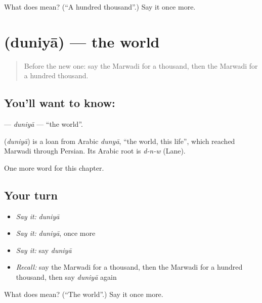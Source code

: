 \begin{tcolorbox}[breakable,colback=teal!4,colframe=teal!35!black,title={Before you move on}]
What does  mean? (\textquotedblleft{}A hundred thousand\textquotedblright{}.) Say it once more.
\end{tcolorbox}
\section[\texorpdfstring{\mw{दुनिया} (duniyā)}{दुनिया (duniyā)}]{ (duniyā) — the world}

\label{lesson:MW-C87-duniya}



\begin{quote}
Before the new one: say the Marwadi for a thousand, then the Marwadi for a hundred thousand.
\end{quote}

\subsection*{You'll want to know: }
\textbf{} — \emph{duniyā} — \textquotedblleft{}the world\textquotedblright{}.

\begin{cousinweb}
\textbf{} (\emph{duniyā}) is a loan from Arabic \emph{dunyā}, \textquotedblleft{}the world, this life\textquotedblright{}, which reached Marwadi through Persian. Its Arabic root is \emph{d-n-w} (Lane).
\end{cousinweb}

\begin{grammarlens}[title={What you've built}]
One more word for this chapter.
\end{grammarlens}

\subsection*{Your turn}
\begin{itemize}
\raggedright
  \item \emph{Say it:} \emph{duniyā}
  \item \emph{Say it:} \emph{duniyā}, once more
  \item \emph{Say it:} say \emph{duniyā}
  \item \emph{Recall:} say the Marwadi for a thousand, then the Marwadi for a hundred thousand, then say \emph{duniyā} again
\end{itemize}

\begin{tcolorbox}[breakable,colback=teal!4,colframe=teal!35!black,title={Before you move on}]
What does  mean? (\textquotedblleft{}The world\textquotedblright{}.) Say it once more.
\end{tcolorbox}
